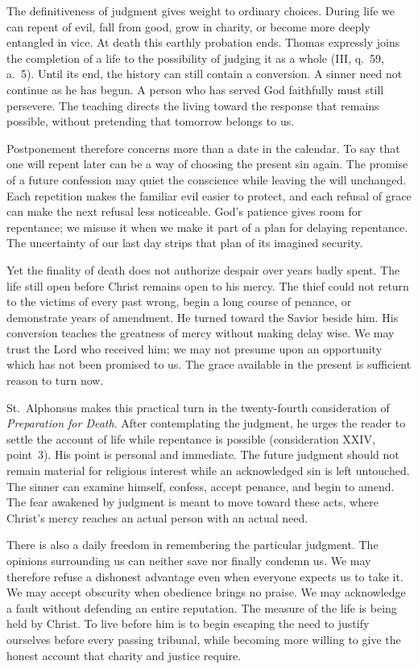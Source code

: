 The definitiveness of judgment gives weight to ordinary choices. During life we can repent of evil, fall from good, grow in charity, or become more deeply entangled in vice. At death this earthly probation ends. Thomas expressly joins the completion of a life to the possibility of judging it as a whole (III, q.~59, a.~5). Until its end, the history can still contain a conversion. A sinner need not continue as he has begun. A person who has served God faithfully must still persevere. The teaching directs the living toward the response that remains possible, without pretending that tomorrow belongs to us.

Postponement therefore concerns more than a date in the calendar. To say that one will repent later can be a way of choosing the present sin again. The promise of a future confession may quiet the conscience while leaving the will unchanged. Each repetition makes the familiar evil easier to protect, and each refusal of grace can make the next refusal less noticeable. God's patience gives room for repentance; we misuse it when we make it part of a plan for delaying repentance. The uncertainty of our last day strips that plan of its imagined security.

Yet the finality of death does not authorize despair over years badly spent. The life still open before Christ remains open to his mercy. The thief could not return to the victims of every past wrong, begin a long course of penance, or demonstrate years of amendment. He turned toward the Savior beside him. His conversion teaches the greatness of mercy without making delay wise. We may trust the Lord who received him; we may not presume upon an opportunity which has not been promised to us. The grace available in the present is sufficient reason to turn now.

St.~Alphonsus makes this practical turn in the twenty-fourth consideration of \emph{Preparation for Death}. After contemplating the judgment, he urges the reader to settle the account of life while repentance is possible (consideration XXIV, point~3). His point is personal and immediate. The future judgment should not remain material for religious interest while an acknowledged sin is left untouched. The sinner can examine himself, confess, accept penance, and begin to amend. The fear awakened by judgment is meant to move toward these acts, where Christ's mercy reaches an actual person with an actual need.

There is also a daily freedom in remembering the particular judgment. The opinions surrounding us can neither save nor finally condemn us. We may therefore refuse a dishonest advantage even when everyone expects us to take it. We may accept obscurity when obedience brings no praise. We may acknowledge a fault without defending an entire reputation. The measure of the life is being held by Christ. To live before him is to begin escaping the need to justify ourselves before every passing tribunal, while becoming more willing to give the honest account that charity and justice require.

